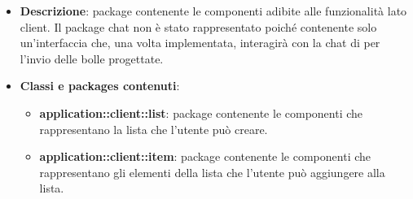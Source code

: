 \begin{itemize}
\item \textbf{Descrizione}: package contenente le componenti adibite alle funzionalità lato client. Il package chat non è stato rappresentato poiché contenente solo un'interfaccia che, una volta implementata, interagirà con la chat di  per l'invio delle bolle progettate.
\item \textbf{Classi e packages contenuti}:
\begin{itemize}
\item \textbf{application::client::list}: package contenente le componenti che rappresentano la lista che l'utente può creare.
\item \textbf{application::client::item}: package contenente le componenti che rappresentano gli elementi della lista che l'utente può aggiungere alla lista.
\end{itemize}
\end{itemize}


